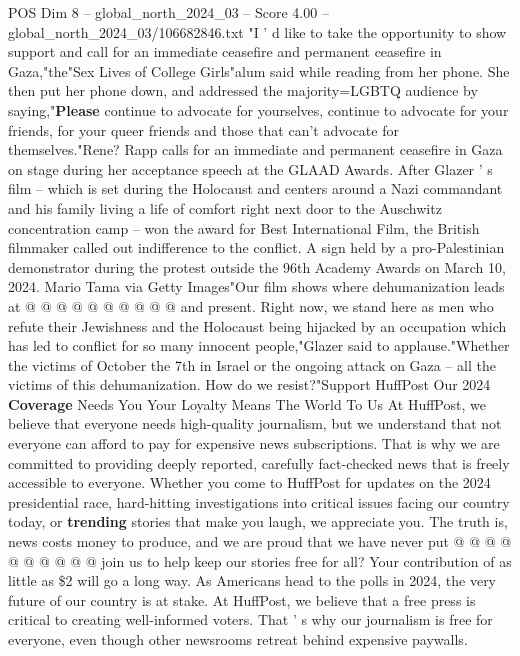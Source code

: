 \begin{textsample}{POS Dim 8 – global\_north\_2024\_03 – Score 4.00 – global\_north\_2024\_03/106682846.txt}  \label{ex:f8_pos_227}
"I ' d like to take the opportunity to show support and call for an immediate ceasefire and permanent ceasefire in Gaza,"the"Sex Lives of College Girls"alum said while reading from her phone.
She then put her phone down, and addressed the majority=LGBTQ audience by saying,"\textbf{Please} continue to advocate for yourselves, continue to advocate for your friends, for your queer friends and those that can't advocate for themselves."Rene?
Rapp calls for an immediate and permanent ceasefire in Gaza on stage during her acceptance speech at the GLAAD Awards.
After Glazer ' s film -- which is set during the Holocaust and centers around a Nazi commandant and his family living a life of comfort right next door to the Auschwitz concentration camp -- won the award for Best International Film, the British filmmaker called out indifference to the conflict.
A sign held by a pro-Palestinian demonstrator during the protest outside the 96th Academy Awards on March 10, 2024.
Mario Tama via Getty Images"Our film shows where dehumanization leads at @ @ @ @ @ @ @ @ @ @ and present.
Right now, we stand here as men who refute their Jewishness and the Holocaust being hijacked by an occupation which has led to conflict for so many innocent people,"Glazer said to applause."Whether the victims of October the 7th in Israel or the ongoing attack on Gaza -- all the victims of this dehumanization.
How do we resist?"Support HuffPost Our 2024 \textbf{Coverage} Needs You Your Loyalty Means The World To Us At HuffPost, we believe that everyone needs high-quality journalism, but we understand that not everyone can afford to pay for expensive news subscriptions.
That is why we are committed to providing deeply reported, carefully fact-checked news that is freely accessible to everyone.
Whether you come to HuffPost for updates on the 2024 presidential race, hard-hitting investigations into critical issues facing our country today, or \textbf{trending} stories that make you laugh, we appreciate you.
The truth is, news costs money to produce, and we are proud that we have never put @ @ @ @ @ @ @ @ @ @ join us to help keep our stories free for all?
Your contribution of as little as \$2 will go a long way.
As Americans head to the polls in 2024, the very future of our country is at stake.
At HuffPost, we believe that a free press is critical to creating well-informed voters.
That ' s why our journalism is free for everyone, even though other newsrooms retreat behind expensive paywalls.

\end{textsample}
